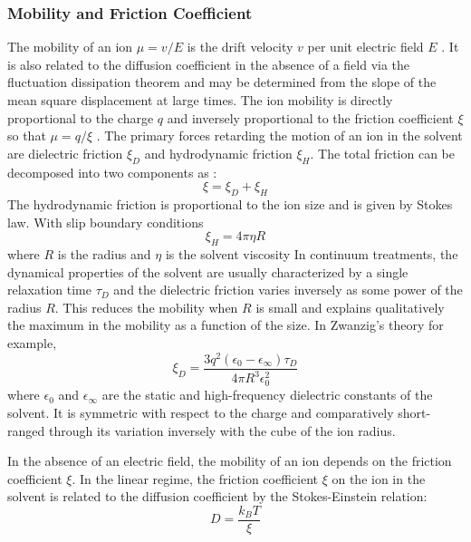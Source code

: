    \subsubsection{Mobility and Friction Coefficient}
  The mobility of an ion $\mu =v/E$ is the drift velocity $v$ per unit electric field $E$ \citep{atkins2006, Kittel2005}. It is also related to the diffusion coefficient in the absence of a field via the fluctuation dissipation theorem and may be determined from the slope of the mean square displacement at large times. The ion mobility  is directly proportional to the charge $q$  and inversely proportional to the friction coefficient $\xi$  so that  $\mu = q/\xi$ . The primary forces retarding the motion of an ion in the solvent are dielectric friction $\xi_D$ and hydrodynamic friction $\xi_H$. The total friction can be decomposed into two components as \citep{koneshan1998friction, koneshan1998solvent}:
   \begin{equation}
   \xi = \xi_D + \xi_H 
   \end{equation}
   The hydrodynamic friction is proportional to the ion size and is given by Stokes law. With slip boundary conditions
   \begin{equation}
   \xi_H  = 4\pi \eta R
   \end{equation}
  where $R$ is the radius and $\eta$ is the solvent viscosity 
   In continuum treatments, the dynamical properties of the solvent are usually characterized by a single relaxation time $\tau_D$ and the  dielectric friction varies inversely as some power of the radius $R$. This reduces the mobility when $R$ is small and explains qualitatively the maximum in the mobility as a function of the size. In Zwanzig's theory for example,
   \begin{equation}
  \xi_D = \frac{3q^2(\epsilon_0 -\epsilon_{\infty})\tau_D}{4 \pi R^3 \epsilon_0^2 } 
   \end{equation}
   where $\epsilon_0$ and $\epsilon_{\infty}$ are the static and high-frequency dielectric constants of the solvent. It is symmetric with respect to the charge and comparatively short-ranged through its variation  inversely with the cube of the ion radius. 
   
   In the absence of an electric field, the mobility of an ion depends on the friction coefficient $\xi$. In the linear regime, the friction coefficient  $\xi$ on the ion in the solvent  is related to the diffusion coefficient  by the Stokes-Einstein relation:
   \begin{equation}
   D = \frac{k_BT}{\xi}
   \label{friction}
   \end{equation}
   
